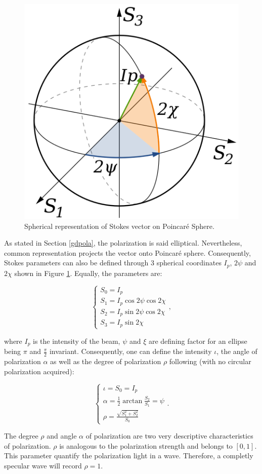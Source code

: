 \begin{figure}[h]
	\centering
	\includegraphics[width=0.3\linewidth]{Figures/Preliminary/pointcare}
	\caption{Spherical representation of Stokes vector on Poincar\'e Sphere.}
	\label{fig:pointcare}
\end{figure}

As stated in Section \ref{gdpola}, the polarization is said elliptical. Nevertheless, common representation projects the vector onto Poincar\'e sphere. Consequently, Stokes parameters can also be defined through 3 spherical coordinates $I_p$, $2\psi$ and $2\chi$ shown in Figure \ref{fig:pointcare}. Equally, the parameters are:

\begin{equation}
	\begin{cases}
	S_0 = I_p \\
	S_1 =  I_p \cos 2\psi \cos 2\chi\\
	S_2 =  I_p \sin 2\psi \cos 2\chi\\
	S_3 =  I_p \sin 2 \chi
	\end{cases},
\end{equation}

where $I_p$ is the intensity of the beam, $\psi$ and $\xi$ are defining factor for an ellipse being $\pi$ and $\frac{\pi}{2}$ invariant.
Consequently, one can define the intensity $\iota$, the angle of polarization $\alpha$ as well as the degree of polarization $\rho$ following (with no circular polarization acquired): 

\begin{equation}
\begin{cases}
\iota = S_0 =  I_p \\[8pt] 
\alpha = \frac{1}{2} \arctan \frac{S_2}{S_1}  = \psi\\[8pt] 
\rho =  \frac{\sqrt{S_1^2 + S_2^2}}{S_0}
\end{cases}.
\end{equation}

The degree $\rho$ and angle $\alpha$ of polarization are two very descriptive characteristics of polarization. $\rho$ is analogous to the polarization strength and belongs to $\left[0,1\right]$. This parameter quantify the polarization light in a wave. Therefore, a completly specular wave will record $\rho = 1$.

